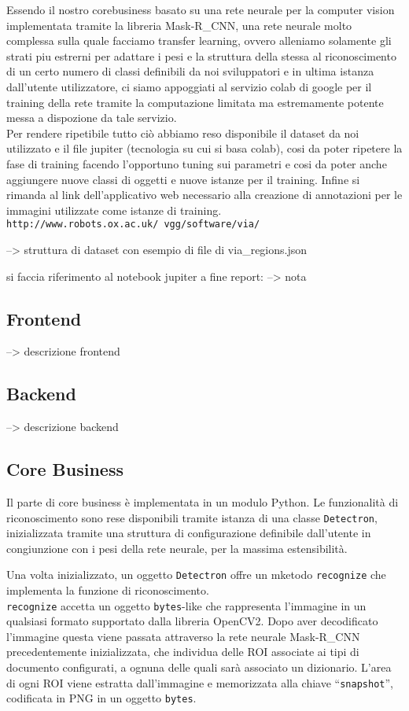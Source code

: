 \documentclass[12pt,a4paper]{article}
\begin{document}
Essendo il nostro corebusiness basato su una rete neurale per la
computer vision implementata tramite la libreria Mask-R\_CNN, una rete
neurale molto complessa sulla quale facciamo transfer learning, ovvero
alleniamo solamente gli strati piu estrerni per adattare i pesi e la
struttura della stessa al riconoscimento di un certo numero di classi
definibili da noi sviluppatori e in ultima istanza dall'utente
utilizzatore, ci siamo appoggiati al servizio colab di google per il
training della rete tramite la computazione limitata ma estremamente
potente messa a dispozione da tale servizio.\\
Per rendere ripetibile tutto ciò abbiamo reso disponibile il dataset da
noi utilizzato e il file jupiter (tecnologia su cui si basa colab), cosi
da poter ripetere la fase di training facendo l'opportuno tuning sui
parametri e cosi da poter anche aggiungere nuove classi di oggetti e
nuove istanze per il training. Infine si rimanda al link
dell'applicativo web necessario alla creazione di annotazioni per le
immagini utilizzate come istanze di training.
\texttt{http://www.robots.ox.ac.uk/~vgg/software/via/}

--> struttura di dataset con esempio di file di via\_regions.json

si faccia riferimento al notebook jupiter a fine report: --> nota %

\subsection{Frontend}

--> descrizione frontend

\subsection{Backend}

--> descrizione backend

\subsection{Core Business}

Il parte di core business è implementata in un modulo Python. Le
funzionalità di riconoscimento sono rese disponibili tramite istanza di
una classe \texttt{Detectron}, inizializzata tramite una struttura di
configurazione definibile dall'utente in congiunzione con i pesi della
rete neurale, per la massima estensibilità.

Una volta inizializzato, un oggetto \texttt{Detectron} offre un mketodo
\texttt{recognize} che implementa la funzione di riconoscimento.\\
\texttt{recognize} accetta un oggetto \texttt{bytes}-like che
rappresenta l'immagine in un qualsiasi formato supportato dalla libreria
OpenCV2. Dopo aver decodificato l'immagine questa viene passata
attraverso la rete neurale Mask-R\_CNN precedentemente inizializzata, che
individua delle ROI associate ai tipi di documento configurati, a ognuna
delle quali sarà associato un dizionario. L'area di ogni ROI viene
estratta dall'immagine e memorizzata alla chiave ``\texttt{snapshot}'',
codificata in PNG in un oggetto \texttt{bytes}.
\end{document}
